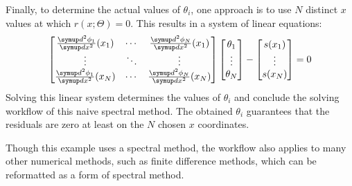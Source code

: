 Finally, to determine the actual values of $\theta_i$, one approach is to use $N$ distinct $x$ values at which $r(x; \Theta) = 0$.
This results in a system of linear equations: 
\begin{equation}\label{eq:spectral-linear-sys}
    \begin{bmatrix}
        \frac{\diff^2 \phi_1}{\diff x^2}(x_1) & \cdots & \frac{\diff^2 \phi_N}{\diff x^2}(x_1) \\
        \vdots & \ddots & \vdots \\
        \frac{\diff^2 \phi_1}{\diff x^2}(x_N) & \cdots & \frac{\diff^2 \phi_N}{\diff x^2}(x_N) \\
    \end{bmatrix}
    \begin{bmatrix}
        \theta_1 \\ \vdots \\ \theta_N
    \end{bmatrix}
    - 
    \begin{bmatrix}
        s(x_1) \\ \vdots \\ s(x_N)
    \end{bmatrix}
    = 0
\end{equation}
Solving this linear system determines the values of $\theta_i$ and conclude the solving workflow of this naive spectral method.
The obtained $\theta_i$ guarantees that the residuals are zero at least on the $N$ chosen $x$ coordinates.

Though this example uses a spectral method, the workflow also applies to many other numerical methods, such as finite difference methods, which can be reformatted as a form of spectral method.

